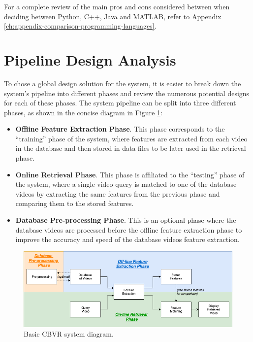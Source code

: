 For a complete review of the main pros and cons considered between when deciding between Python, C++, Java and MATLAB, refer to Appendix \ref{ch:appendix-comparison-programming-languages}.


\section{Pipeline Design Analysis}

To chose a global design solution for the system, it is easier to break down the system's pipeline into different phases and review the numerous potential designs for each of these phases. The system pipeline can be split into three different phases, as shown in the concise diagram in Figure \ref{fig:basic-cbvr-diagram}:

\begin{itemize}
    \item \textbf{Offline Feature Extraction Phase}. This phase corresponds to the ``training'' phase of the system, where features are extracted from each video in the database and then stored in data files to be later used in the retrieval phase.
    \item \textbf{Online Retrieval Phase}. This phase is affiliated to the ``testing'' phase of the system, where a single video query is matched to one of the database videos by extracting the same features from the previous phase and comparing them to the stored features.
    \item \textbf{Database Pre-processing Phase}. This is an optional phase where the database videos are processed before the offline feature extraction phase to improve the accuracy and speed of the database videos feature extraction.
\end{itemize}

\begin{figure}[h]
\centerline{\includegraphics[width=1.1\textwidth]{figures/design/basic_cbvr_phases.png}}
\caption{\label{fig:basic-cbvr-diagram}Basic CBVR system diagram.}
\end{figure}

